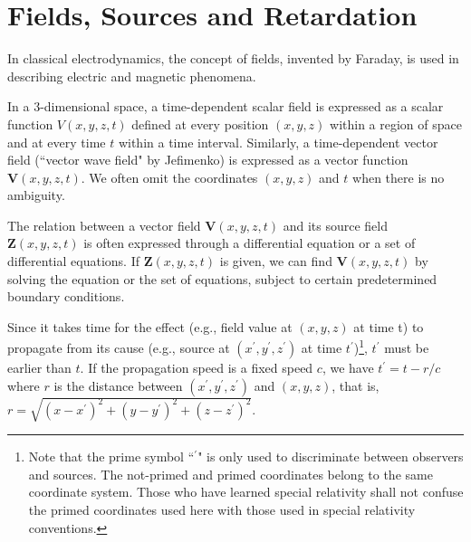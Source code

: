 \documentclass[11pt]{article}              %
\begin{document}

\section{Fields, Sources and Retardation}
In classical electrodynamics, the concept of fields, invented by Faraday, is used in describing electric and magnetic phenomena. 

In a 3-dimensional space, a time-dependent scalar field is expressed as a scalar function $V(x,y,z,t)$ defined at every position $(x,y,z)$ within a region of space and at every time $t$ within a time interval. Similarly, a time-dependent vector field (``vector wave field" by Jefimenko) is expressed as a vector function ${\mathbf V}(x,y,z,t)$. We often omit the coordinates $(x,y,z)$ and $t$ when there is no ambiguity.

The relation between a vector field ${\mathbf V(x,y,z,t)}$ and its source field ${\mathbf Z(x,y,z,t)}$ is often expressed through a differential equation or a set of differential equations. If ${\mathbf Z(x,y,z,t)}$ is given, we can find ${\mathbf V(x,y,z,t)}$ by solving the equation or the set of equations, subject to certain predetermined boundary conditions.



Since it takes time for the effect (e.g., field value at $(x,y,z)$ at time t) to propagate from its cause (e.g., source at $(x^\prime,y^\prime,z^\prime)$ at time $t^\prime$)\footnote{Note that the prime symbol ``$^\prime$" is only used to discriminate between observers and sources. The not-primed and primed coordinates belong to the same coordinate system. Those who have learned special relativity shall not confuse the primed coordinates used here with those used in special relativity conventions.}, $t^\prime$ must be earlier than $t$. If the propagation speed is a fixed speed $c$, we have $t^\prime=t-r/c$ where $r$ is the distance between $(x^\prime,y^\prime,z^\prime)$ and $(x,y,z)$, that is, $r=\sqrt{(x-x^\prime)^2+(y-y^\prime)^2+(z-z^\prime)^2}$. 
\end{document}
